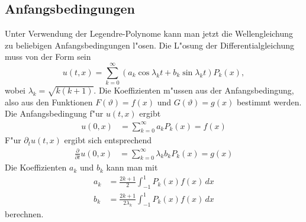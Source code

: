 \subsection{Anfangsbedingungen}
Unter Verwendung der Legendre-Polynome kann man jetzt die Wellengleichung
zu beliebigen Anfangsbedingungen l"osen.
Die L"osung der Differentialgleichung muss von der Form sein
\[
u(t, x)=\sum_{k=0}^{\infty}(a_k\cos \lambda_k t+b_k\sin\lambda_k t)P_k(x),
\]
wobei $\lambda_k=\sqrt{k(k+1)}$.
Die Koeffizienten m"ussen aus der Anfangsbedingung, also aus den 
Funktionen $F(\vartheta)=f(x)$ und $G(\vartheta)=g(x)$ bestimmt werden.
Die Anfangsbedingung f"ur $u(t,x)$ ergibt
\begin{align*}
u(0,x)
&=\sum_{k=0}^{\infty} a_kP_k(x)=f(x)
\end{align*}
F"ur $\partial_tu(t,x)$ ergibt sich entsprechend
\begin{align*}
\frac{\partial}{\partial t}u(0,x)
&=\sum_{k=0}^{\infty} \lambda_k b_kP_k(x)=g(x)
\end{align*}
Die Koeffizienten $a_k$ und $b_k$ kann man mit
\begin{align*}
a_k&=
\frac{2k+1}{2}\int_{-1}^1 P_k(x)f(x)\,dx
\\
b_k&=
\frac{2k+1}{2\lambda_k}\int_{-1}^1P_k(x)f(x)\,dx
\end{align*}
berechnen.

